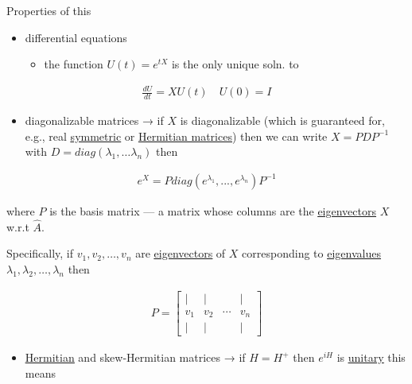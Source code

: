 \documentclass[
]{article}
\providecommand{\tightlist}{%
  \setlength{\itemsep}{0pt}\setlength{\parskip}{0pt}}
\let\oldhyperref\hyperref
\renewcommand{\hyperref}[2][]{\oldhyperref[#1]{\underline{#2}}}
\begin{document}
Properties of this

\begin{itemize}
	\tightlist
	\item
	      differential equations

	      \begin{itemize}
		      \tightlist
		      \item
		            the function \(U(t)=e^{tX}\) is the only unique soln. to
	      \end{itemize}
\end{itemize}

\begin{gather*}
	\frac{dU}{dt}=XU(t)\quad U(0)=I
\end{gather*}

\begin{itemize}
	\tightlist
	\item
	      diagonalizable matrices → if \(X\) is diagonalizable (which is
	      guaranteed for, e.g., real \hyperref[symmetric-matrix]{symmetric} or \hyperref[hermitian-matrix]{Hermitian matrices}) then
	      we can write \(X=PDP^{-1}\) with
	      \(D=diag(\lambda_1, … \lambda_n)\) then
\end{itemize}

\begin{gather*}
	e^X=Pdiag(e^{\lambda_1},...,e^{\lambda_n})P^{-1}
\end{gather*}

where \(P\) is the basis matrix --- a matrix whose columns are the
\hyperref[eigenvectorseigenvalues]{eigenvectors} \(X\) w.r.t \(\hat{A}\).

Specifically, if \(v_1,v_2,…,v_n\) are \hyperref[eigenvectorseigenvalues]{eigenvectors} of \(X\)
corresponding to \hyperref[eigenvectorseigenvalues]{eigenvalues} \(\lambda_1,\lambda_2,…,\lambda_n\) then

\begin{gather*}
	P = \begin{bmatrix} | & | & & | \\ v_1 & v_2 & \cdots & v_n \\ | & | & & | \end{bmatrix}
\end{gather*}

\begin{itemize}
	\tightlist
	\item
	      \hyperref[hermitian-matrix]{Hermitian} and skew-Hermitian matrices → if \(H=H^+\) then \(e^{iH}\)
	      is \hyperref[unitary-operator]{unitary} this means
\end{itemize}
\end{document}
